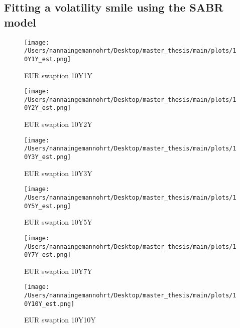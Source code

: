 \subsection{Fitting a volatility smile using the SABR model}
\begin{figure}[H]
    \centering
    \begin{minipage}{0.5\textwidth}
        \texttt{[image: /Users/nannaingemannohrt/Desktop/master\_thesis/main/plots/10Y1Y\_est.png]}
        \caption{EUR swaption 10Y1Y}
        \label{fig:10Y1Y}
    \end{minipage}\hfill 
    \begin{minipage}{0.5\textwidth}
        \texttt{[image: /Users/nannaingemannohrt/Desktop/master\_thesis/main/plots/10Y2Y\_est.png]}
        \caption{EUR swaption 10Y2Y}
        \label{fig:10Y2Y}
    \end{minipage}

    \centering
    \begin{minipage}{0.5\textwidth}
        \texttt{[image: /Users/nannaingemannohrt/Desktop/master\_thesis/main/plots/10Y3Y\_est.png]}
        \caption{EUR swaption 10Y3Y}
        \label{fig:10Y3Y}
    \end{minipage}\hfill 
    \begin{minipage}{0.5\textwidth}
        \texttt{[image: /Users/nannaingemannohrt/Desktop/master\_thesis/main/plots/10Y5Y\_est.png]}
        \caption{EUR swaption 10Y5Y}
        \label{fig:10Y5Y}
    \end{minipage}

    \centering
    \begin{minipage}{0.5\textwidth}
        \texttt{[image: /Users/nannaingemannohrt/Desktop/master\_thesis/main/plots/10Y7Y\_est.png]}
        \caption{EUR swaption 10Y7Y}
        \label{fig:10Y7Y}
    \end{minipage}\hfill 
    \begin{minipage}{0.5\textwidth}
        \texttt{[image: /Users/nannaingemannohrt/Desktop/master\_thesis/main/plots/10Y10Y\_est.png]}
        \caption{EUR swaption 10Y10Y}
        \label{fig:10Y10Y}
    \end{minipage}    
\end{figure}

